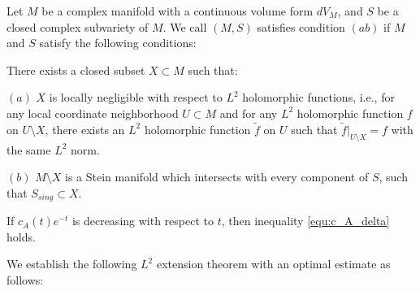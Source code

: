 \begin{definition}[][Condition (ab)]
  Let $M$ be a complex manifold with a continuous volume form
  $dV_{M}$, and $S$ be a closed complex subvariety of $M$. We call
  $(M,S)$ satisfies condition $(ab)$ if $M$ and $S$ satisfy the
  following conditions:
  
  There exists a closed subset $X\subset M$ such that:
  
  $(a)$ $X$ is locally negligible with respect to $L^2$ holomorphic
  functions, i.e., for any local coordinate neighborhood $U\subset M$
  and for any $L^2$ holomorphic function $f$ on $U\setminus X$, there
  exists an $L^2$ holomorphic function $\tilde{f}$ on $U$ such that
  $\tilde{f}|_{U\setminus X}=f$ with the same $L^{2}$ norm.
  
  $(b)$ $M\setminus X$ is a Stein manifold which intersects with every component of $S$,
  such that $S_{sing}\subset X$.
  \end{definition}

If $c_{A}(t)e^{-t}$ is decreasing with respect to $t$, then
inequality \ref{equ:c_A_delta} holds.

We establish the following $L^{2}$ extension theorem with an optimal
estimate as follows:

